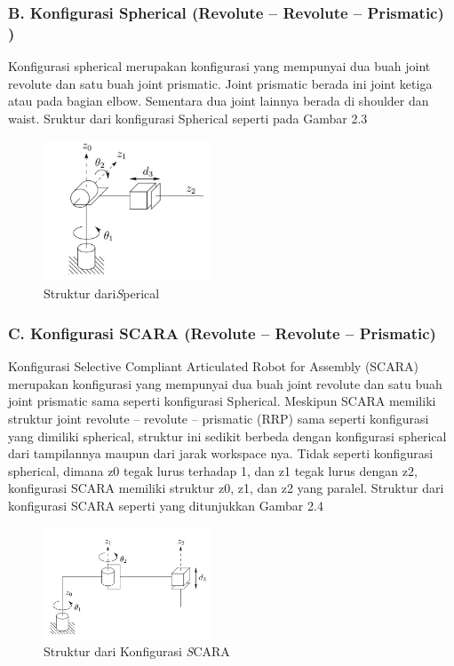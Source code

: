 \subsubsection{B. Konfigurasi Spherical (Revolute – Revolute – Prismatic)   )} 

Konfigurasi spherical merupakan konfigurasi yang mempunyai dua buah joint revolute dan satu buah joint prismatic. Joint prismatic berada ini joint ketiga atau pada bagian elbow. Sementara dua joint lainnya berada di shoulder dan waist. Sruktur dari konfigurasi Spherical seperti pada Gambar 2.3
	\begin{figure}[H]
	\centering
	\includegraphics[width=5cm]{gambar/spherical.jpg}
	\caption{Struktur dari\emph Sperical}
\end{figure}


\subsubsection{C. Konfigurasi SCARA (Revolute – Revolute – Prismatic) } 

Konfigurasi Selective Compliant Articulated Robot for Assembly (SCARA) merupakan konfigurasi yang mempunyai dua buah joint revolute dan satu buah joint prismatic sama seperti konfigurasi Spherical. Meskipun SCARA memiliki struktur joint revolute – revolute – prismatic (RRP) sama seperti konfigurasi yang dimiliki spherical, struktur ini sedikit berbeda dengan konfigurasi spherical dari tampilannya maupun dari jarak workspace nya. Tidak seperti konfigurasi spherical, dimana z0 tegak lurus terhadap 1, dan z1 tegak lurus dengan z2, konfigurasi SCARA memiliki struktur z0, z1, dan z2 yang paralel. Struktur dari konfigurasi SCARA seperti yang ditunjukkan Gambar 2.4
	\begin{figure}[H]
	\centering
	\includegraphics[width=5cm]{gambar/scara.jpg}
	\caption{Struktur dari Konfigurasi \emph SCARA}
\end{figure}

